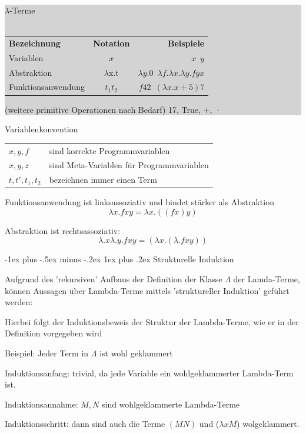 \documentclass[10pt]{article}
\makeatletter
\renewcommand{\subsubsection}{\@startsection{subsubsection}{3}{0mm}%
                                {-1ex plus -.5ex minus -.2ex}%
                                {1ex plus .2ex}%
                                {\normalfont\small\bfseries}}
\makeatother
\begin{document}
\subitem\colorbox{lightgray}{
  \begin{minipage}[h]{0.9\linewidth}
    $\lambda$-Terme\\ \\
    \begin{tabular}[h]{lcr}
      \textbf {Bezeichnung} & \textbf{Notation} & \textbf{Beispiele}                                         \\
      Variablen             & $x$               & $x \enspace y$                                             \\
      Abstraktion           & $\lambda$x.t      & $\lambda y.0 \enspace \lambda f. \lambda x. \lambda y.fyx$ \\
      Funktionsanwendung    & $t_1t_2$          & $f 42 \enspace ( \lambda x.x+5)7$
    \end{tabular}
    (weitere primitive Operationen nach Bedarf) 17, True, +, ·		
  \end{minipage}
}

Variablenkonvention
\begin{tabular}[h]{l l}
  $x ,y ,f$         & \enspace  sind korrekte Programmvariablen           \\
  $x, y, z$         & \enspace  sind Meta-Variablen für Programmvariablen \\
  $t, t', t_1, t_2$ & \enspace  bezeichnen immer einen Term
\end{tabular}

Funktionsanwendung ist linksassoziativ und bindet stärker als Abstraktion
$$\lambda x.fxy = \lambda x.((fx)y)$$

Abstraktion ist rechtsassoziativ: 
$$\lambda.x\lambda.y.fxy = (\lambda x.( \lambda.fxy))$$

\subsubsection{Strukturelle Induktion}
\begin{itemize*}
  \item Aufgrund des 'rekursiven' Aufbaus der Definition der Klasse $\Lambda$ der Lamda-Terme, können Aussagen über Lambda-Terme mittels \color{blue} 'struktureller Induktion' \color{black} geführt werden:
  \begin{itemize*}
    \item Hierbei folgt der Induktionsbeweis der Struktur der Lambda-Terme, wie er in der Definition vorgegeben wird
  \end{itemize*}
  \item Beispiel: Jeder Term in $\Lambda$ ist wohl geklammert
  \begin{itemize*}
    \item \color{blue}Induktionsanfang: \color{black} trivial, da jede Variable ein wohlgeklammerter Lambda-Term ist.
    \item \color{blue} Induktionsannahme: \color{black} $M,N$ sind wohlgeklammerte Lambda-Terme
    \item \color{blue} Induktionsschritt: \color{black} dann sind auch die Terme $(MN)$ und ($\lambda xM$) wolgeklammert.
  \end{itemize*}
\end{itemize*}
\end{document}
